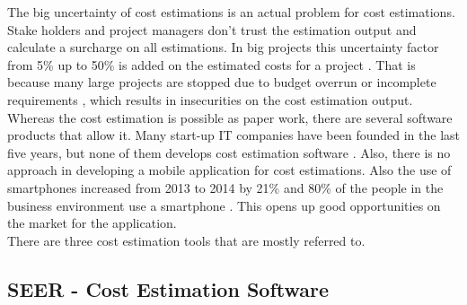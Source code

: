 The big uncertainty of cost estimations is an actual problem for cost estimations. Stake holders and project managers don't trust the estimation output and calculate a surcharge on all estimations. In big projects this uncertainty factor from 5\% up to 50\% is added on the estimated costs for a project \cite{fischer}. That is because many large projects are stopped due to budget overrun or incomplete requirements \cite{chaos}, which results in insecurities on the cost estimation output.\\  
Whereas the cost estimation is possible as paper work, there are several software products that allow it. Many start-up IT companies have been founded in the last five years, but none of them develops cost estimation software \cite{dsm}. Also, there is no approach in developing a mobile application for cost estimations. Also the use of smartphones increased from 2013 to 2014 by 21\% and 80\% of the people in the business environment use a smartphone \cite{faszinationmobile}. This opens up good opportunities on the market for the application.\\
There are three cost estimation tools that are mostly referred to.\\

\subsection{SEER - Cost Estimation Software}

